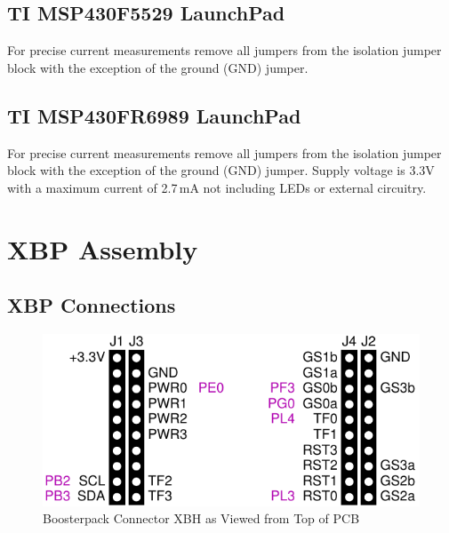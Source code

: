 \documentclass[twoside,11pt]{cergdoc}
\begin{document}
\section{TI MSP430F5529 LaunchPad\texttrademark}

For precise current measurements remove all jumpers from the isolation jumper block 
with the exception of the ground (GND) jumper. 

\section{TI MSP430FR6989 LaunchPad\texttrademark}

For precise current measurements remove all jumpers from the isolation jumper block 
with the exception of the ground (GND) jumper. Supply voltage is 3.3V with a maximum 
current of 2.7\,mA not including LEDs or external circuitry.

\chapter{XBP Assembly}

\section{XBP Connections}

\begin{figure}[ht]
  \begin{center}
    \includegraphics[scale=1]{figures/xbp-xbh}
    \caption{Boosterpack Connector XBH as Viewed from Top of PCB}
  \end{center}
\end{figure}
\end{document}
